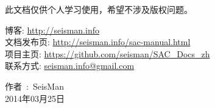 此文档仅供个人学习使用，希望不涉及版权问题。

\begin{flushleft}
博客: \url{http://seisman.info}                                         \\
文档发布页: \url{http://seisman.info/sac-manual.html}                   \\
项目主页: \url{https://github.com/seisman/SAC_Docs_zh}                  \\
联系方式: \url{seisman.info@gmail.com}  
\end{flushleft}

\begin{flushright}
作者~:~SeisMan \\
2014年03月25日
\end{flushright}
